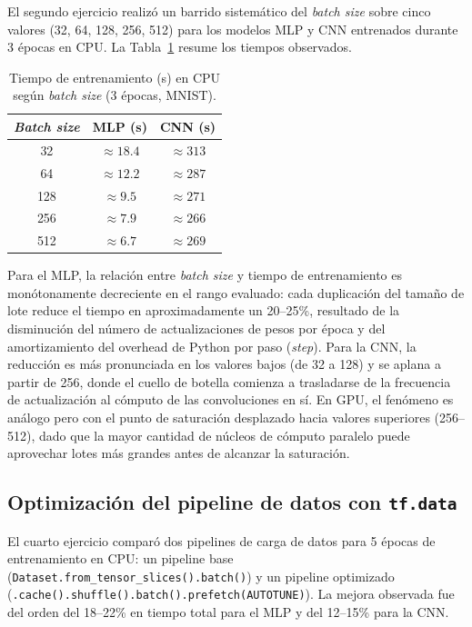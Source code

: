 \documentclass[12pt, a4paper]{article}
\begin{document}
El segundo ejercicio realizó un barrido sistemático del \textit{batch size} sobre cinco valores (32, 64, 128, 256, 512) para los modelos MLP y CNN entrenados durante 3 épocas en CPU. La Tabla~\ref{tab:batchsize} resume los tiempos observados.

\begin{table}[h!]
  \centering
  \caption{Tiempo de entrenamiento (s) en CPU según \textit{batch size} (3 épocas, MNIST).}
  \label{tab:batchsize}
  \begin{tabular}{ccc}
    \toprule
    \textbf{\textit{Batch size}} & \textbf{MLP (s)} & \textbf{CNN (s)} \\
    \midrule
    32  & $\approx 18.4$ & $\approx 313$ \\
    64  & $\approx 12.2$ & $\approx 287$ \\
    128 & $\approx 9.5$  & $\approx 271$ \\
    256 & $\approx 7.9$  & $\approx 266$ \\
    512 & $\approx 6.7$  & $\approx 269$ \\
    \bottomrule
  \end{tabular}
\end{table}

Para el MLP, la relación entre \textit{batch size} y tiempo de entrenamiento es monótonamente decreciente en el rango evaluado: cada duplicación del tamaño de lote reduce el tiempo en aproximadamente un 20--25\%, resultado de la disminución del número de actualizaciones de pesos por época y del amortizamiento del overhead de Python por paso (\textit{step}). Para la CNN, la reducción es más pronunciada en los valores bajos (de 32 a 128) y se aplana a partir de 256, donde el cuello de botella comienza a trasladarse de la frecuencia de actualización al cómputo de las convoluciones en sí. En GPU, el fenómeno es análogo pero con el punto de saturación desplazado hacia valores superiores (256--512), dado que la mayor cantidad de núcleos de cómputo paralelo puede aprovechar lotes más grandes antes de alcanzar la saturación.

\subsection{Optimización del pipeline de datos con \texttt{tf.data}}

El cuarto ejercicio comparó dos pipelines de carga de datos para 5 épocas de entrenamiento en CPU: un pipeline base (\texttt{Dataset.from\_tensor\_slices().batch()}) y un pipeline optimizado (\texttt{.cache().shuffle().batch().prefetch(AUTOTUNE)}). La mejora observada fue del orden del 18--22\% en tiempo total para el MLP y del 12--15\% para la CNN.
\end{document}
